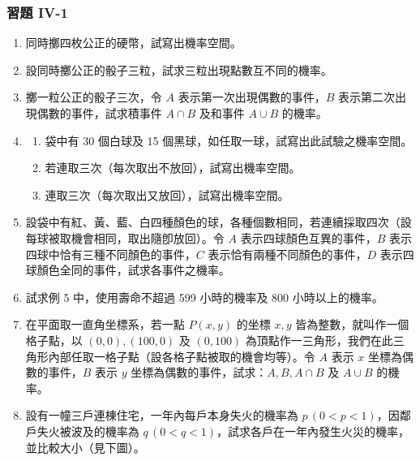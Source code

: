 \subsubsection*{習題 IV-1}\label{sec:b5s-ex4-1}

\begin{enumerate}[label=\textbf{\arabic*.}]
  \item 同時擲四枚公正的硬幣，試寫出機率空間。
  \item 設同時擲公正的骰子三粒，試求三粒出現點數互不同的機率。
  \item 擲一粒公正的骰子三次，令 $A$ 表示第一次出現偶數的事件，$B$ 表示第二次出現偶數的事件，試求積事件 $A \cap B$ 及和事件 $A \cup B$ 的機率。
  \item 
  \begin{enumerate}[label=(\arabic*)]
    \item 袋中有 30 個白球及 15 個黑球，如任取一球，試寫出此試驗之機率空間。
    \item 若連取三次（每次取出不放回），試寫出機率空間。
    \item 連取三次（每次取出又放回），試寫出機率空間。
  \end{enumerate}
  \item 設袋中有紅、黃、藍、白四種顏色的球，各種個數相同，若連續採取四次（設每球被取機會相同，取出隨卽放回）。令 $A$ 表示四球顏色互異的事件，$B$ 表示四球中恰有三種不同顏色的事件，$C$ 表示恰有兩種不同顏色的事件，$D$ 表示四球顏色全同的事件，試求各事件之機率。
  \item 試求例 5 中，使用壽命不超過 599 小時的機率及 800 小時以上的機率。
  \item 在平面取一直角坐標系，若一點 $P(x, y)$ 的坐標 $x, y$ 皆為整數，就叫作一個格子點，以 $(0, 0), (100, 0)$ 及 $(0, 100)$ 為頂點作一三角形，我們在此三角形內部任取一格子點（設各格子點被取的機會均等）。令 $A$ 表示 $x$ 坐標為偶數的事件，$B$ 表示 $y$ 坐標為偶數的事件，試求：$A, B, A \cap B$ 及 $A \cup B$ 的機率。
  \item[\textbf{** 9.}\footnotemark] 設有一幢三戶連棟住宅，一年內每戶本身失火的機率為 $p\,(0 < p < 1)$，因鄰戶失火被波及的機率為 $q\,(0 < q < 1)$，試求各戶在一年內發生火災的機率，並比較大小（見下圖）。
  \label{note:b5s-ch4-p123-q8}

  \begin{center}
\end{center}
\end{enumerate}

